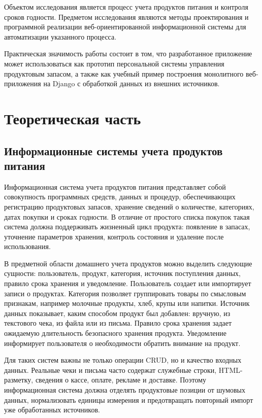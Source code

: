 \documentclass[14pt,a4paper]{extreport}
\renewcommand{\thechapter}{\arabic{chapter}}
\begin{document}
Объектом исследования является процесс учета продуктов питания и контроля сроков годности. Предметом исследования являются методы проектирования и программной реализации веб-ориентированной информационной системы для автоматизации указанного процесса.

Практическая значимость работы состоит в том, что разработанное приложение может использоваться как прототип персональной системы управления продуктовым запасом, а также как учебный пример построения монолитного веб-приложения на Django с обработкой данных из внешних источников.

\newpage
\chapter[Глава \thechapter Теоретическая часть]{Теоретическая часть}

\section{Информационные системы учета продуктов питания}

Информационная система учета продуктов питания представляет собой совокупность программных средств, данных и процедур, обеспечивающих регистрацию продуктовых запасов, хранение сведений о количестве, категориях, датах покупки и сроках годности. В отличие от простого списка покупок такая система должна поддерживать жизненный цикл продукта: появление в запасах, уточнение параметров хранения, контроль состояния и удаление после использования.

В предметной области домашнего учета продуктов можно выделить следующие сущности: пользователь, продукт, категория, источник поступления данных, правило срока хранения и уведомление. Пользователь создает или импортирует записи о продуктах. Категория позволяет группировать товары по смысловым признакам, например молочные продукты, хлеб, крупы или напитки. Источник данных показывает, каким способом продукт был добавлен: вручную, из текстового чека, из файла или из письма. Правило срока хранения задает ожидаемую длительность безопасного хранения продукта. Уведомление информирует пользователя о необходимости обратить внимание на продукт.

Для таких систем важны не только операции CRUD, но и качество входных данных. Реальные чеки и письма часто содержат служебные строки, HTML-разметку, сведения о кассе, оплате, рекламе и доставке. Поэтому информационная система должна отделять продуктовые позиции от шумовых данных, нормализовать единицы измерения и предотвращать повторный импорт уже обработанных источников.
\end{document}
